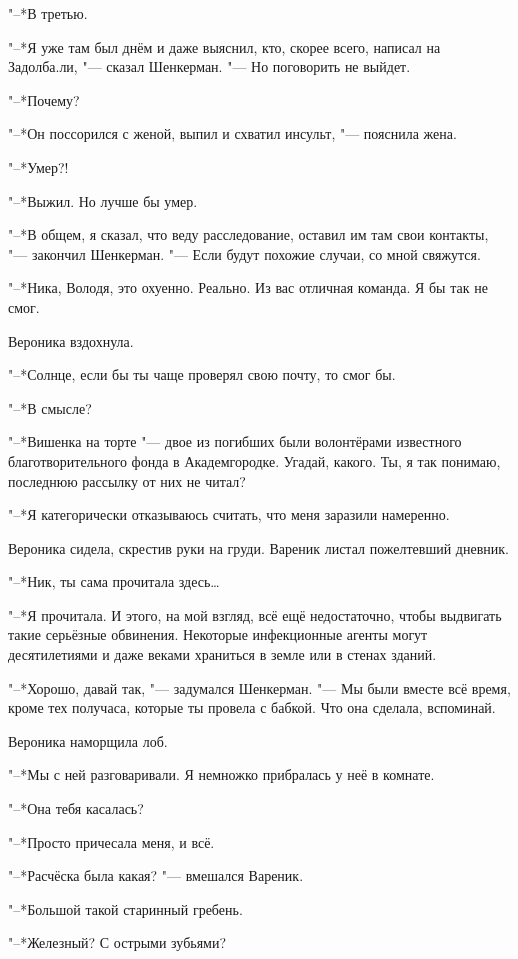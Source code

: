 "--*В третью.

"--*Я уже там был днём и даже выяснил, кто, скорее всего, написал на Задолба.ли, "--- сказал Шенкерман.
"--- Но поговорить не выйдет.

"--*Почему?

"--*Он поссорился с женой, выпил и схватил инсульт, "--- пояснила жена.

"--*Умер?!

"--*Выжил.
Но лучше бы умер.

"--*В общем, я сказал, что веду расследование, оставил им там свои контакты, "--- закончил Шенкерман.
"--- Если будут похожие случаи, со мной свяжутся.

"--*Ника, Володя, это охуенно.
Реально.
Из вас отличная команда.
Я бы так не смог.

Вероника вздохнула.

"--*Солнце, если бы ты чаще проверял свою почту, то смог бы.

"--*В смысле?

"--*Вишенка на торте "--- двое из погибших были волонтёрами известного благотворительного фонда в Академгородке.
Угадай, какого.
Ты, я так понимаю, последнюю рассылку от них не читал?

\asterism

"--*Я категорически отказываюсь считать, что меня заразили намеренно.

Вероника сидела, скрестив руки на груди.
Вареник листал пожелтевший дневник.

"--*Ник, ты сама прочитала здесь\ldots{}

"--*Я прочитала.
И этого, на мой взгляд, всё ещё недостаточно, чтобы выдвигать такие серьёзные обвинения.
Некоторые инфекционные агенты могут десятилетиями и даже веками храниться в земле или в стенах зданий.

"--*Хорошо, давай так, "--- задумался Шенкерман.
"--- Мы были вместе всё время, кроме тех получаса, которые ты провела с бабкой.
Что она сделала, вспоминай.

Вероника наморщила лоб.

"--*Мы с ней разговаривали.
Я немножко прибралась у неё в комнате.

"--*Она тебя касалась?

"--*Просто причесала меня, и всё.

"--*Расчёска была какая? "--- вмешался Вареник.

"--*Большой такой старинный гребень.

"--*Железный?
С острыми зубьями?

